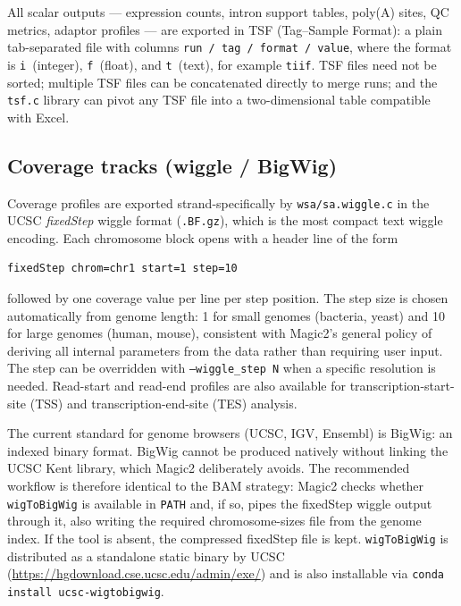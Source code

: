 \documentclass[11pt]{article}
\begin{document}
All scalar outputs --- expression counts, intron support tables,
poly(A) sites, QC metrics, adaptor profiles --- are exported in
TSF (Tag--Sample Format): a plain tab-separated file with columns
\texttt{run\,/\,tag\,/\,format\,/\,value}, where the format is
\texttt{i}~(integer), \texttt{f}~(float), and \texttt{t}~(text),
for example \texttt{tiif}.
TSF files need not be sorted; multiple TSF files can be concatenated
directly to merge runs; and the \texttt{tsf.c} library can pivot any
TSF file into a two-dimensional table compatible with Excel.

\subsection{Coverage tracks (wiggle / BigWig)}
\label{sec:wiggle}

Coverage profiles are exported strand-specifically by
\texttt{wsa/sa.wiggle.c} in the UCSC \emph{fixedStep} wiggle format
(\texttt{.BF.gz}), which is the most compact text wiggle encoding.
Each chromosome block opens with a header line of the form
\begin{lstlisting}
fixedStep chrom=chr1 start=1 step=10
\end{lstlisting}
followed by one coverage value per line per step position.
The step size is chosen automatically from genome length: 1 for
small genomes (bacteria, yeast) and 10 for large genomes (human,
mouse), consistent with Magic2's general policy of deriving all
internal parameters from the data rather than requiring user input.
The step can be overridden with \texttt{--wiggle\_step~N} when a
specific resolution is needed.
Read-start and read-end profiles are also available for
transcription-start-site (TSS) and transcription-end-site (TES)
analysis.

The current standard for genome browsers (UCSC, IGV, Ensembl) is
BigWig: an indexed binary format.
BigWig cannot be produced natively without linking the UCSC Kent
library, which Magic2 deliberately avoids.
The recommended workflow is therefore identical to the BAM strategy:
Magic2 checks whether \texttt{wigToBigWig} is available in
\texttt{PATH} and, if so, pipes the fixedStep wiggle output through
it, also writing the required chromosome-sizes file from the genome
index.
If the tool is absent, the compressed fixedStep file is kept.
\texttt{wigToBigWig} is distributed as a standalone static binary
by UCSC (\url{https://hgdownload.cse.ucsc.edu/admin/exe/}) and is
also installable via \texttt{conda install ucsc-wigtobigwig}.
\end{document}
